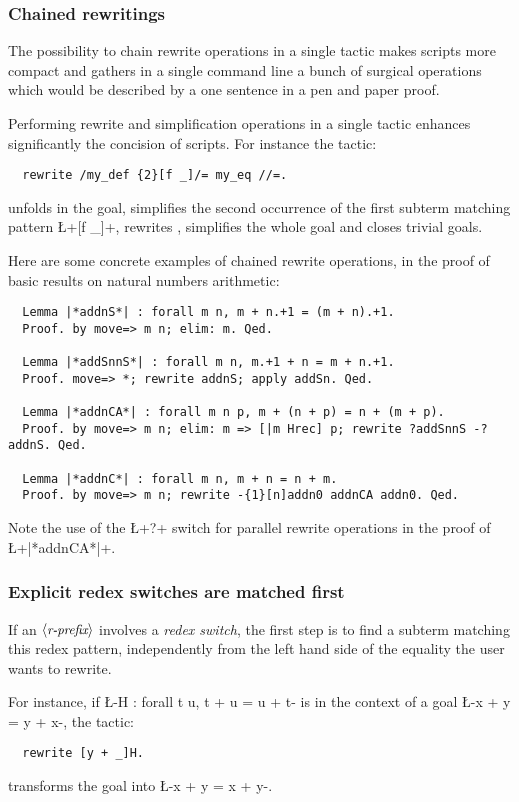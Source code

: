\subsubsection*{Chained rewritings}


The possibility to chain rewrite operations in a single tactic makes
scripts more compact and gathers in a single command line a bunch
of surgical
operations  which would be described by a one sentence in a pen and
paper proof.

Performing rewrite and simplification operations in a single tactic
enhances significantly the concision of scripts. For instance the
tactic:
\begin{lstlisting}
  rewrite /my_def {2}[f _]/= my_eq //=.
\end{lstlisting}
unfolds  in the goal, simplifies the second occurrence of the
first subterm matching pattern \L+[f _]+, rewrites ,
simplifies the whole goal and closes trivial goals.

Here are some concrete examples of chained rewrite operations, in the
proof of basic results on natural numbers arithmetic:

\begin{lstlisting}
  Lemma |*addnS*| : forall m n, m + n.+1 = (m + n).+1.
  Proof. by move=> m n; elim: m. Qed.

  Lemma |*addSnnS*| : forall m n, m.+1 + n = m + n.+1.
  Proof. move=> *; rewrite addnS; apply addSn. Qed.

  Lemma |*addnCA*| : forall m n p, m + (n + p) = n + (m + p).
  Proof. by move=> m n; elim: m => [|m Hrec] p; rewrite ?addSnnS -?addnS. Qed.

  Lemma |*addnC*| : forall m n, m + n = n + m.
  Proof. by move=> m n; rewrite -{1}[n]addn0 addnCA addn0. Qed.
\end{lstlisting}

Note the use of the \L+?+ switch for parallel rewrite operations in
the proof of \L+|*addnCA*|+.

\subsubsection*{Explicit redex switches are matched first}
If an $\langle\mbox{\itshape\rmfamily\small r-prefix}\rangle$ involves a \emph{redex switch}, the first step is to
find a subterm matching this redex pattern, independently from the left hand
side  of the equality the user wants to rewrite.

For instance, if \L-H : forall t u, t + u = u + t- is in the context of a
goal \L-x + y = y + x-, the tactic:
\begin{lstlisting}
  rewrite [y + _]H.
\end{lstlisting}
transforms the goal into \L-x + y = x + y-.

